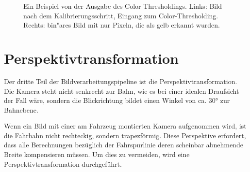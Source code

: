 \documentclass[arbeit=studie,oneside,BCOR=12mm]{ArbeitRST}
\begin{document}
\begin{figure}[h]
    \centering
    \caption{Ein Beispiel von der Ausgabe des Color-Thresholdings. Links: Bild
    nach dem Kalibrierungsschritt, Eingang zum \glqq Color-Thresholding\grqq.
    Rechts: bin"ares Bild mit nur Pixeln, die als gelb erkannt wurden.}
    \label{color-thresholding}
\end{figure}

\section{Perspektivtransformation}

Der dritte Teil der Bildverarbeitungspipeline ist die Perspektivtransformation. 
Die Kamera steht nicht senkrecht zur Bahn, wie es bei einer idealen
Draufsicht der Fall wäre, sondern die Blickrichtung bildet einen Winkel von ca.
30° zur Bahnebene.

Wenn ein Bild mit einer am Fahrzeug montierten Kamera aufgenommen wird, ist die
Fahrbahn nicht rechteckig, sondern trapezförmig. Diese Perspektive
erfordert, dass alle Berechnungen bezüglich der Fahrspurlinie deren scheinbar abnehmende
Breite kompensieren müssen. Um dies zu vermeiden, wird eine
Perspektivtransformation durchgeführt. 
\end{document}
